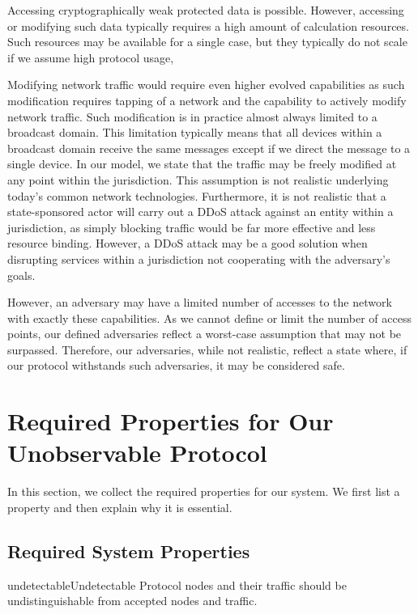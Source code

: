 Accessing cryptographically weak protected data is possible. However, accessing or modifying such data typically requires a high amount of calculation resources. Such resources may be available for a single case, but they typically do not scale if we assume high protocol usage,

Modifying network traffic would require even higher evolved capabilities as such modification requires tapping of a network and the capability to actively modify network traffic. Such modification is in practice almost always limited to a broadcast domain. This limitation typically means that all devices within a broadcast domain receive the same messages except if we direct the message to a single device. In our model, we state that the traffic may be freely modified at any point within the jurisdiction. This assumption is not realistic underlying today's common network technologies.
Furthermore, it is not realistic that a state-sponsored actor will carry out a DDoS attack against an entity within a jurisdiction, as simply blocking traffic would be far more effective and less resource binding. However, a DDoS attack may be a good solution when disrupting services within a jurisdiction not cooperating with the adversary's goals.

However, an adversary may have a limited number of accesses to the network with exactly these capabilities. As we cannot define or limit the number of access points, our defined adversaries reflect a worst-case assumption that may not be surpassed. Therefore, our adversaries, while not realistic, reflect a state where, if our protocol withstands such adversaries, it may be considered safe.

\section{Required Properties for Our Unobservable Protocol}\label{sec:properties}
In this section, we collect the required properties for our system. We first list a property and then explain why it is essential.

\subsection{Required System Properties}\label{sec:requirements}

\begin{requirement}{undetectable}{Undetectable}
	Protocol nodes and their traffic should be undistinguishable from accepted nodes and traffic. 
\end{requirement}

